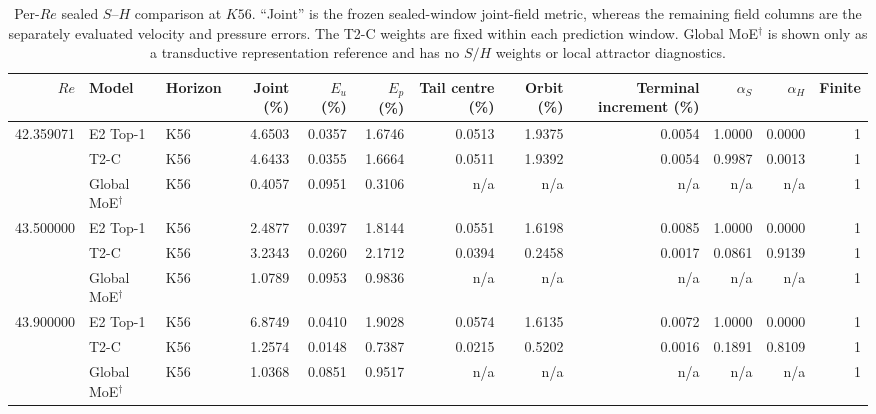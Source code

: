 \begin{table}[t]
\centering
\caption{Per-$Re$ sealed $S$--$H$ comparison at $K56$.  ``Joint'' is the
frozen sealed-window joint-field metric, whereas the remaining field columns
are the separately evaluated velocity and pressure errors.  The T2-C weights
are fixed within each prediction window.  Global MoE$^\dagger$ is shown only
as a transductive representation reference and has no $S/H$ weights or local
attractor diagnostics.}
\label{tab:cylinder_sh_boundary}
\scriptsize
\setlength{\tabcolsep}{3.7pt}
\begin{adjustbox}{max width=\textwidth}
\begin{tabular}{@{}rllrrrrrrrrr@{}}
\toprule
$Re$ & Model & Horizon & Joint (\%) & $E_u$ (\%) & $E_p$ (\%) &
Tail centre (\%) & Orbit (\%) & Terminal increment (\%) &
$\alpha_S$ & $\alpha_H$ & Finite \\
\midrule
42.359071 & E2 Top-1 & K56 & 4.6503 & 0.0357 & 1.6746 & 0.0513 & 1.9375 & 0.0054 & 1.0000 & 0.0000 & 1 \\
          & T2-C      & K56 & 4.6433 & 0.0355 & 1.6664 & 0.0511 & 1.9392 & 0.0054 & 0.9987 & 0.0013 & 1 \\
          & Global MoE$^\dagger$ & K56 & 0.4057 & 0.0951 & 0.3106 & n/a & n/a & n/a & n/a & n/a & 1 \\
\midrule
43.500000 & E2 Top-1 & K56 & 2.4877 & 0.0397 & 1.8144 & 0.0551 & 1.6198 & 0.0085 & 1.0000 & 0.0000 & 1 \\
          & T2-C      & K56 & 3.2343 & 0.0260 & 2.1712 & 0.0394 & 0.2458 & 0.0017 & 0.0861 & 0.9139 & 1 \\
          & Global MoE$^\dagger$ & K56 & 1.0789 & 0.0953 & 0.9836 & n/a & n/a & n/a & n/a & n/a & 1 \\
\midrule
43.900000 & E2 Top-1 & K56 & 6.8749 & 0.0410 & 1.9028 & 0.0574 & 1.6135 & 0.0072 & 1.0000 & 0.0000 & 1 \\
          & T2-C      & K56 & 1.2574 & 0.0148 & 0.7387 & 0.0215 & 0.5202 & 0.0016 & 0.1891 & 0.8109 & 1 \\
          & Global MoE$^\dagger$ & K56 & 1.0368 & 0.0851 & 0.9517 & n/a & n/a & n/a & n/a & n/a & 1 \\
\bottomrule
\end{tabular}
\end{adjustbox}
\end{table}

